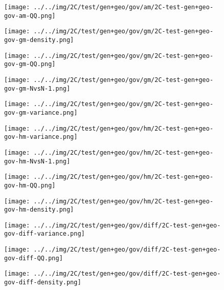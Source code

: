 \begin{figure}[H]
\centering	\texttt{[image: ../../img/2C/test/gen+geo/gov/am/2C-test-gen+geo-gov-am-QQ.png]}
\end{figure}
\begin{figure}[H]
\centering	\texttt{[image: ../../img/2C/test/gen+geo/gov/gm/2C-test-gen+geo-gov-gm-density.png]}
\end{figure}
\begin{figure}[H]
\centering	\texttt{[image: ../../img/2C/test/gen+geo/gov/gm/2C-test-gen+geo-gov-gm-QQ.png]}
\end{figure}
\begin{figure}[H]
\centering	\texttt{[image: ../../img/2C/test/gen+geo/gov/gm/2C-test-gen+geo-gov-gm-NvsN-1.png]}
\end{figure}
\begin{figure}[H]
\centering	\texttt{[image: ../../img/2C/test/gen+geo/gov/gm/2C-test-gen+geo-gov-gm-variance.png]}
\end{figure}
\begin{figure}[H]
\centering	\texttt{[image: ../../img/2C/test/gen+geo/gov/hm/2C-test-gen+geo-gov-hm-variance.png]}
\end{figure}
\begin{figure}[H]
\centering	\texttt{[image: ../../img/2C/test/gen+geo/gov/hm/2C-test-gen+geo-gov-hm-NvsN-1.png]}
\end{figure}
\begin{figure}[H]
\centering	\texttt{[image: ../../img/2C/test/gen+geo/gov/hm/2C-test-gen+geo-gov-hm-QQ.png]}
\end{figure}
\begin{figure}[H]
\centering	\texttt{[image: ../../img/2C/test/gen+geo/gov/hm/2C-test-gen+geo-gov-hm-density.png]}
\end{figure}
\begin{figure}[H]
\centering	\texttt{[image: ../../img/2C/test/gen+geo/gov/diff/2C-test-gen+geo-gov-diff-variance.png]}
\end{figure}
\begin{figure}[H]
\centering	\texttt{[image: ../../img/2C/test/gen+geo/gov/diff/2C-test-gen+geo-gov-diff-QQ.png]}
\end{figure}
\begin{figure}[H]
\centering	\texttt{[image: ../../img/2C/test/gen+geo/gov/diff/2C-test-gen+geo-gov-diff-density.png]}
\end{figure}
